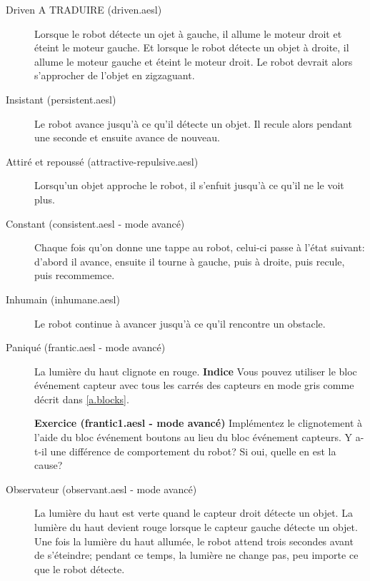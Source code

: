 \begin{description}
\item[Driven A TRADUIRE (driven.aesl)]
Lorsque le robot détecte un ojet à gauche, il allume le moteur droit et éteint le moteur gauche.
Et lorsque le robot détecte un objet à droite, il allume le moteur gauche et éteint le moteur droit.
Le robot devrait alors s'approcher de l'objet en zigzaguant.

\item[Insistant (persistent.aesl)]
Le robot avance jusqu'à ce qu'il détecte un objet.
Il recule alors pendant une seconde et ensuite avance de nouveau.

\item[Attiré et repoussé (attractive-repulsive.aesl)]
Lorsqu'un objet approche le robot, il s'enfuit jusqu'à ce qu'il ne le voit plus.

\item[Constant (consistent.aesl - mode avancé)]
Chaque fois qu'on donne une tappe au robot, celui-ci passe à l'état suivant:
d'abord il avance, ensuite il tourne à gauche, puis à droite, puis recule, puis recommemce.

\item[Inhumain (inhumane.aesl)]
Le robot continue à avancer jusqu'à ce qu'il rencontre un obstacle.

\item[Paniqué (frantic.aesl - mode avancé)]
La lumière du haut clignote en rouge.
\textbf{Indice} Vous pouvez utiliser le bloc événement capteur avec tous les carrés des capteurs en mode gris comme décrit dans \cref{a.blocks}.

\textbf{Exercice (frantic1.aesl - mode avancé)}
Implémentez le clignotement à l'aide du bloc événement boutons au lieu du bloc événement capteurs.
Y a-t-il une différence de comportement du robot? Si oui, quelle en est la cause?

\item[Observateur (observant.aesl - mode avancé)]
La lumière du haut est verte quand le capteur droit détecte un objet.
La lumière du haut devient rouge lorsque le capteur gauche détecte un objet.
Une fois la lumière du haut allumée, le robot attend trois secondes avant de s'éteindre;
pendant ce temps, la lumière ne change pas, peu importe ce que le robot détecte.

\end{description}
